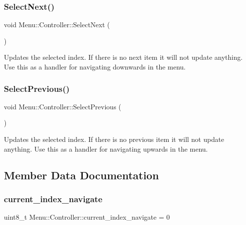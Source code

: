 \subsubsection{\texorpdfstring{Select\+Next()}{SelectNext()}}
{\footnotesize\ttfamily void Menu\+::\+Controller\+::\+Select\+Next (\begin{DoxyParamCaption}{ }\end{DoxyParamCaption})}

Updates the selected index. If there is no next item it will not update anything. Use this as a handler for navigating downwards in the menu. \hypertarget{class_menu_1_1_controller_a04e3448cfe4341ad7209a9f16bbcb449}{}\label{class_menu_1_1_controller_a04e3448cfe4341ad7209a9f16bbcb449} 
\subsubsection{\texorpdfstring{Select\+Previous()}{SelectPrevious()}}
{\footnotesize\ttfamily void Menu\+::\+Controller\+::\+Select\+Previous (\begin{DoxyParamCaption}{ }\end{DoxyParamCaption})}

Updates the selected index. If there is no previous item it will not update anything. Use this as a handler for navigating upwards in the menu. 

\subsection{Member Data Documentation}
\hypertarget{class_menu_1_1_controller_a86055b66afbad89c5a0b8a0a1713f9d3}{}\label{class_menu_1_1_controller_a86055b66afbad89c5a0b8a0a1713f9d3} 
\subsubsection{\texorpdfstring{current\+\_\+index\+\_\+navigate}{current\_index\_navigate}}
{\footnotesize\ttfamily uint8\+\_\+t Menu\+::\+Controller\+::current\+\_\+index\+\_\+navigate = 0\hspace{0.3cm}{\ttfamily [private]}}

